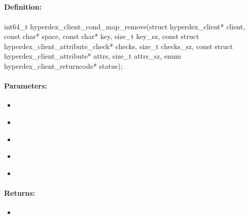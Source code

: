\pagebreak
\subsection{}
\label{api:c:cond_map_remove}


\paragraph{Definition:}
\begin{ccode}
int64_t hyperdex_client_cond_map_remove(struct hyperdex_client* client,
        const char* space,
        const char* key, size_t key_sz,
        const struct hyperdex_client_attribute_check* checks, size_t checks_sz,
        const struct hyperdex_client_attribute* attrs, size_t attrs_sz,
        enum hyperdex_client_returncode* status);
\end{ccode}

\paragraph{Parameters:}
\begin{itemize}[noitemsep]
\item {}\\

\item {}\\

\item {}\\

\item {}\\

\item {}\\

\end{itemize}

\paragraph{Returns:}
\begin{itemize}[noitemsep]
\item {}\\

\end{itemize}


